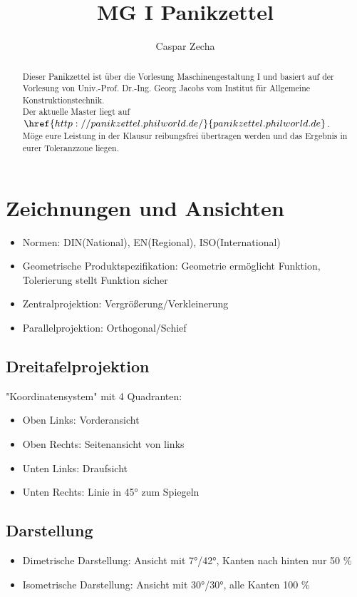 \documentclass[a4paper,parskip=half*,DIV=7,fontsize=11pt]{scrartcl}
\title{MG I Panikzettel}
\author{Caspar Zecha}
\begin{document}
	
\maketitle
	
\begin{abstract}
	Dieser Panikzettel ist über die Vorlesung Maschinengestaltung I und basiert auf der Vorlesung von Univ.-Prof. Dr.-Ing. Georg Jacobs vom Institut für Allgemeine Konstruktionstechnik.\\
	Der aktuelle Master liegt auf $\href{http://panikzettel.philworld.de/}{panikzettel.philworld.de}$.\\
	Möge eure Leistung in der Klausur reibungsfrei übertragen werden und das Ergebnis in eurer Toleranzzone liegen.\\
\end{abstract}
	
\tableofcontents
	
\pagebreak
	
\section{Zeichnungen und Ansichten}
\begin{itemize}
	\item Normen: DIN(National), EN(Regional), ISO(International)
	\item Geometrische Produktspezifikation: Geometrie ermöglicht Funktion, Tolerierung stellt Funktion sicher
	\item Zentralprojektion: Vergrößerung/Verkleinerung
	\item Parallelprojektion: Orthogonal/Schief
\end{itemize}
	
\subsection{Dreitafelprojektion}
"Koordinatensystem" mit 4 Quadranten:
\begin{itemize}
	\item Oben Links: Vorderansicht
	\item Oben Rechts: Seitenansicht von links
	\item Unten Links: Draufsicht
	\item Unten Rechts: Linie in 45° zum Spiegeln
\end{itemize}
	
\subsection{Darstellung}
\begin{itemize}
	\item Dimetrische Darstellung: Ansicht mit 7°/42°, Kanten nach hinten nur 50 \%
	\item Isometrische Darstellung: Ansicht mit 30°/30°, alle Kanten 100 \%
\end{itemize}
	
\end{document}
